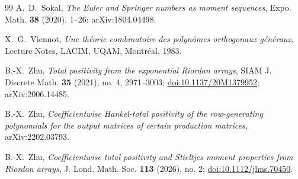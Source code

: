 \documentclass[11pt,a4paper]{article}
\theoremstyle{plain}
\theoremstyle{definition}
\theoremstyle{remark}
\begin{document}
\begin{thebibliography}{99}
A.~D.~Sokal,
\emph{The Euler and Springer numbers as moment sequences},
Expo. Math. \textbf{38} (2020), 1--26; arXiv:1804.04498.

X.~G.~Viennot,
\emph{Une th\'eorie combinatoire des polyn\^omes orthogonaux g\'en\'eraux},
Lecture Notes, LACIM, UQAM, Montr\'eal, 1983.

B.-X.~Zhu,
\emph{Total positivity from the exponential Riordan arrays},
SIAM J. Discrete Math. \textbf{35} (2021), no. 4, 2971--3003;
\href{https://doi.org/10.1137/20M1379952}{doi:10.1137/20M1379952};
arXiv:2006.14485.

B.-X.~Zhu,
\emph{Coefficientwise Hankel-total positivity of the row-generating polynomials
for the output matrices of certain production matrices},
arXiv:2202.03793.

B.-X.~Zhu,
\emph{Coefficientwise total positivity and Stieltjes moment properties from
Riordan arrays},
J. Lond. Math. Soc. \textbf{113} (2026), no. 2;
\href{https://doi.org/10.1112/jlms.70450}{doi:10.1112/jlms.70450}.

\end{thebibliography}
\end{document}
